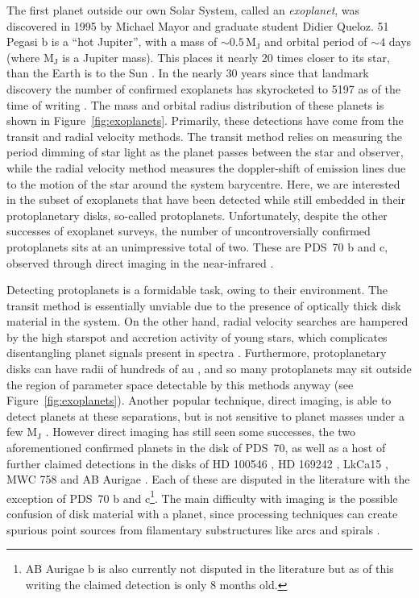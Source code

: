 The first planet outside our own Solar System, called an \textit{exoplanet}, was discovered in 1995 by Michael Mayor and graduate student Didier Queloz.
51 Pegasi b is a ``hot Jupiter'', with a mass of $\sim 0.5 \, \mathrm{M_J}$ and orbital period of $\sim 4$ days (where $\mathrm{M_J}$ is a Jupiter mass).
This places it nearly 20 times closer to its star, than the Earth is to the Sun \citep{mayor1995}.
In the nearly 30 years since that landmark discovery the number of confirmed exoplanets has skyrocketed to 5197 as of the time of writing \citep{nasa2022}.
The mass and orbital radius distribution of these planets is shown in Figure~\ref{fig:exoplanets}.
Primarily, these detections have come from the transit and radial velocity methods.
The transit method relies on measuring the period dimming of star light as the planet passes between the star and observer, while the radial velocity method measures the doppler-shift of emission lines due to the motion of the star around the system barycentre.
Here, we are interested in the subset of exoplanets that have been detected while still embedded in their protoplanetary disks, so-called protoplanets.
Unfortunately, despite the other successes of exoplanet surveys, the number of uncontroversially confirmed protoplanets sits at an unimpressive total of two.
These are PDS~70 b and c, observed through direct imaging in the near-infrared \citep{keppler2018,haffert2019}.

Detecting protoplanets is a formidable task, owing to their environment.
The transit method is essentially unviable due to the presence of optically thick disk material in the system.
On the other hand, radial velocity searches are hampered by the high starspot and accretion activity of young stars, which complicates disentangling planet signals present in spectra \citep{desort2007}.
Furthermore, protoplanetary disks can have radii of hundreds of au \citep[e.g.][]{tripathi2017}, and so many protoplanets may sit outside the region of parameter space detectable by this methods anyway (see Figure~\ref{fig:exoplanets}).
Another popular technique, direct imaging, is able to detect planets at these separations, but is not sensitive to planet masses under a few $\mathrm{M_J}$ \citep{jorquera2021}.
However direct imaging has still seen some successes, the two aforementioned confirmed planets in the disk of PDS~70, as well as a host of further claimed detections in the disks of HD 100546 \citep{quanz2013}, HD 169242 \citep{biller2014}, LkCa15 \citep{sallum2015}, MWC 758 \citep{reggiani2018} and AB Aurigae \citep{currie2022}. Each of these are disputed in the literature \citep{rameau2017,ligi2018,currie2019} with the exception of PDS~70 b and c\footnote{AB Aurigae b is also currently not disputed in the literature but as of this writing the claimed detection is only 8 months old.}.
The main difficulty with imaging is the possible confusion of disk material with a planet, since processing techniques can create spurious point sources from filamentary substructures like arcs and spirals \citep[eg.][]{rameau2017}.

